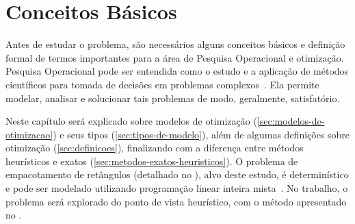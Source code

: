 \chapter{Conceitos Básicos}\label{ch:conceitos-basicos}


Antes de estudar o problema, são necessários alguns conceitos básicos e definição formal de termos
importantes para a área de Pesquisa Operacional e otimização.
Pesquisa Operacional pode ser entendida como o estudo e a aplicação de métodos científicos para
tomada de decisões em problemas complexos~\cite[p.IX]{arenales}.
Ela permite modelar, analisar e solucionar tais problemas de modo, geralmente, satisfatório.

Neste capítulo será explicado sobre modelos de otimização (\autoref{sec:modelos-de-otimizacao})
e seus tipos (\autoref{sec:tipos-de-modelo}), além de algumas definições sobre otimização
(\autoref{sec:definicoes}), finalizando com a diferença entre métodos heurísticos e exatos
(\cref{sec:metodos-exatos-heuristicos}).
O problema de empacotamento de retângulos (detalhado no ),
alvo deste estudo, é determinístico e pode ser modelado utilizando programação linear inteira
mista~\cite{wolsey2020integer}.
No trabalho, o problema será explorado do ponto de vista heurístico, com o método apresentado no
.





